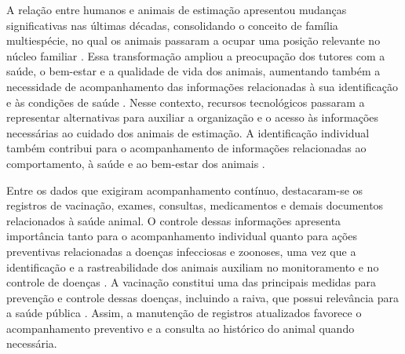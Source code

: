 \documentclass{UNESC}
\begin{document}

A relação entre humanos e animais de estimação apresentou mudanças significativas nas últimas décadas, consolidando o conceito de família multiespécie, no qual os animais passaram a ocupar uma posição relevante no núcleo familiar \cite{BOLSON2022}. Essa transformação ampliou a preocupação dos tutores com a saúde, o bem-estar e a qualidade de vida dos animais, aumentando também a necessidade de acompanhamento das informações relacionadas à sua identificação e às condições de saúde \cite{MORAES2024}. Nesse contexto, recursos tecnológicos passaram a representar alternativas para auxiliar a organização e o acesso às informações necessárias ao cuidado dos animais de estimação. A identificação individual também contribui para o acompanhamento de informações relacionadas ao comportamento, à saúde e ao bem-estar dos animais \cite{vidal2021}.

Entre os dados que exigiram acompanhamento contínuo, destacaram-se os registros de vacinação, exames, consultas, medicamentos e demais documentos relacionados à saúde animal. O controle dessas informações apresenta importância tanto para o acompanhamento individual quanto para ações preventivas relacionadas a doenças infecciosas e zoonoses, uma vez que a identificação e a rastreabilidade dos animais auxiliam no monitoramento e no controle de doenças \cite{murphy2008}. A vacinação constitui uma das principais medidas para prevenção e controle dessas doenças, incluindo a raiva, que possui relevância para a saúde pública \cite{MOUTINHO2017}. Assim, a manutenção de registros atualizados favorece o acompanhamento preventivo e a consulta ao histórico do animal quando necessária.
\end{document}
